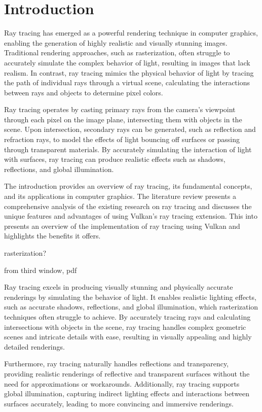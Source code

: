 \documentclass[conference]{IEEEtran}
\begin{document}
\section{Introduction} \label{introduction}
Ray tracing has emerged as a powerful rendering technique in computer graphics, enabling the generation of highly realistic and visually stunning images. Traditional rendering approaches, such as rasterization, often struggle to accurately simulate the complex behavior of light, resulting in images that lack realism. In contrast, ray tracing mimics the physical behavior of light by tracing the path of individual rays through a virtual scene, calculating the interactions between rays and objects to determine pixel colors.



Ray tracing operates by casting primary rays from the camera's viewpoint through each pixel on the image plane, intersecting them with objects in the scene. Upon intersection, secondary rays can be generated, such as reflection and refraction rays, to model the effects of light bouncing off surfaces or passing through transparent materials. By accurately simulating the interaction of light with surfaces, ray tracing can produce realistic effects such as shadows, reflections, and global illumination.


The introduction provides an overview of ray tracing, its fundamental concepts, and its applications in computer graphics. The literature review presents a comprehensive analysis of the existing research on ray tracing and discusses the unique features and advantages of using Vulkan's ray tracing extension.
This into presents an overview of the implementation of ray tracing using Vulkan and highlights the benefits it offers. 

rasterization?

from third window, pdf


Ray tracing excels in producing visually stunning and physically accurate renderings by simulating the behavior of light. It enables realistic lighting effects, such as accurate shadows, reflections, and global illumination, which rasterization techniques often struggle to achieve. By accurately tracing rays and calculating intersections with objects in the scene, ray tracing handles complex geometric scenes and intricate details with ease, resulting in visually appealing and highly detailed renderings.

Furthermore, ray tracing naturally handles reflections and transparency, providing realistic renderings of reflective and transparent surfaces without the need for approximations or workarounds. Additionally, ray tracing supports global illumination, capturing indirect lighting effects and interactions between surfaces accurately, leading to more convincing and immersive renderings.
\end{document}
